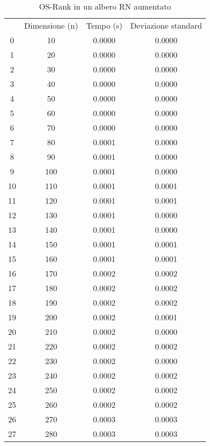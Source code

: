 \begin{table}
\centering
\caption{OS-Rank in un albero RN aumentato}
\label{OS-Rank in un albero RN aumentato}
\begin{adjustbox}{width=1\textwidth/2}
\begin{tabular}{|c|c|c|c|}
\hline
 & Dimensione (n) & Tempo (s) & Deviazione standard \\
0 & 10 & 0.0000 & 0.0000 \\
\cline{1-4}
1 & 20 & 0.0000 & 0.0000 \\
\cline{1-4}
2 & 30 & 0.0000 & 0.0000 \\
\cline{1-4}
3 & 40 & 0.0000 & 0.0000 \\
\cline{1-4}
4 & 50 & 0.0000 & 0.0000 \\
\cline{1-4}
5 & 60 & 0.0000 & 0.0000 \\
\cline{1-4}
6 & 70 & 0.0000 & 0.0000 \\
\cline{1-4}
7 & 80 & 0.0001 & 0.0000 \\
\cline{1-4}
8 & 90 & 0.0001 & 0.0000 \\
\cline{1-4}
9 & 100 & 0.0001 & 0.0000 \\
\cline{1-4}
10 & 110 & 0.0001 & 0.0001 \\
\cline{1-4}
11 & 120 & 0.0001 & 0.0001 \\
\cline{1-4}
12 & 130 & 0.0001 & 0.0000 \\
\cline{1-4}
13 & 140 & 0.0001 & 0.0000 \\
\cline{1-4}
14 & 150 & 0.0001 & 0.0001 \\
\cline{1-4}
15 & 160 & 0.0001 & 0.0001 \\
\cline{1-4}
16 & 170 & 0.0002 & 0.0002 \\
\cline{1-4}
17 & 180 & 0.0002 & 0.0002 \\
\cline{1-4}
18 & 190 & 0.0002 & 0.0002 \\
\cline{1-4}
19 & 200 & 0.0002 & 0.0001 \\
\cline{1-4}
20 & 210 & 0.0002 & 0.0000 \\
\cline{1-4}
21 & 220 & 0.0002 & 0.0002 \\
\cline{1-4}
22 & 230 & 0.0002 & 0.0000 \\
\cline{1-4}
23 & 240 & 0.0002 & 0.0002 \\
\cline{1-4}
24 & 250 & 0.0002 & 0.0002 \\
\cline{1-4}
25 & 260 & 0.0002 & 0.0002 \\
\cline{1-4}
26 & 270 & 0.0003 & 0.0003 \\
\cline{1-4}
27 & 280 & 0.0003 & 0.0003 \\

\end{tabular}
\end{adjustbox}
\end{table}
